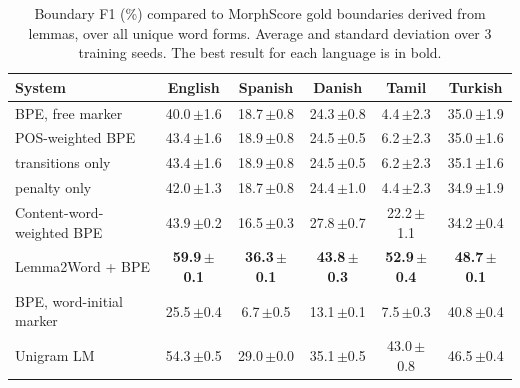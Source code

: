 \begin{table}[!ht]
\centering
\caption{Boundary F1 (\%) compared to MorphScore gold boundaries derived from lemmas, over all unique word forms. Average and standard deviation over 3 training seeds. The best result for each language is in bold.}
\label{tab:f1}
\small
\setlength{\tabcolsep}{4pt}
\begin{tabular}{lccccc}
\toprule
System & English & Spanish & Danish & Tamil & Turkish \\
\midrule
BPE, free marker & 40.0\,{\scriptsize$\pm$1.6} & 18.7\,{\scriptsize$\pm$0.8} & 24.3\,{\scriptsize$\pm$0.8} & 4.4\,{\scriptsize$\pm$2.3} & 35.0\,{\scriptsize$\pm$1.9} \\
POS-weighted BPE & 43.4\,{\scriptsize$\pm$1.6} & 18.9\,{\scriptsize$\pm$0.8} & 24.5\,{\scriptsize$\pm$0.5} & 6.2\,{\scriptsize$\pm$2.3} & 35.0\,{\scriptsize$\pm$1.6} \\
\quad transitions only & 43.4\,{\scriptsize$\pm$1.6} & 18.9\,{\scriptsize$\pm$0.8} & 24.5\,{\scriptsize$\pm$0.5} & 6.2\,{\scriptsize$\pm$2.3} & 35.1\,{\scriptsize$\pm$1.6} \\
\quad penalty only & 42.0\,{\scriptsize$\pm$1.3} & 18.7\,{\scriptsize$\pm$0.8} & 24.4\,{\scriptsize$\pm$1.0} & 4.4\,{\scriptsize$\pm$2.3} & 34.9\,{\scriptsize$\pm$1.9} \\
\addlinespace[2pt]
Content-word-weighted BPE & 43.9\,{\scriptsize$\pm$0.2} & 16.5\,{\scriptsize$\pm$0.3} & 27.8\,{\scriptsize$\pm$0.7} & 22.2\,{\scriptsize$\pm$1.1} & 34.2\,{\scriptsize$\pm$0.4} \\
Lemma2Word + BPE & \textbf{59.9\,{\scriptsize$\pm$0.1}} & \textbf{36.3\,{\scriptsize$\pm$0.1}} & \textbf{43.8\,{\scriptsize$\pm$0.3}} & \textbf{52.9\,{\scriptsize$\pm$0.4}} & \textbf{48.7\,{\scriptsize$\pm$0.1}} \\
BPE, word-initial marker & 25.5\,{\scriptsize$\pm$0.4} & 6.7\,{\scriptsize$\pm$0.5} & 13.1\,{\scriptsize$\pm$0.1} & 7.5\,{\scriptsize$\pm$0.3} & 40.8\,{\scriptsize$\pm$0.4} \\
Unigram LM & 54.3\,{\scriptsize$\pm$0.5} & 29.0\,{\scriptsize$\pm$0.0} & 35.1\,{\scriptsize$\pm$0.5} & 43.0\,{\scriptsize$\pm$0.8} & 46.5\,{\scriptsize$\pm$0.4} \\
\bottomrule
\end{tabular}
\end{table}
